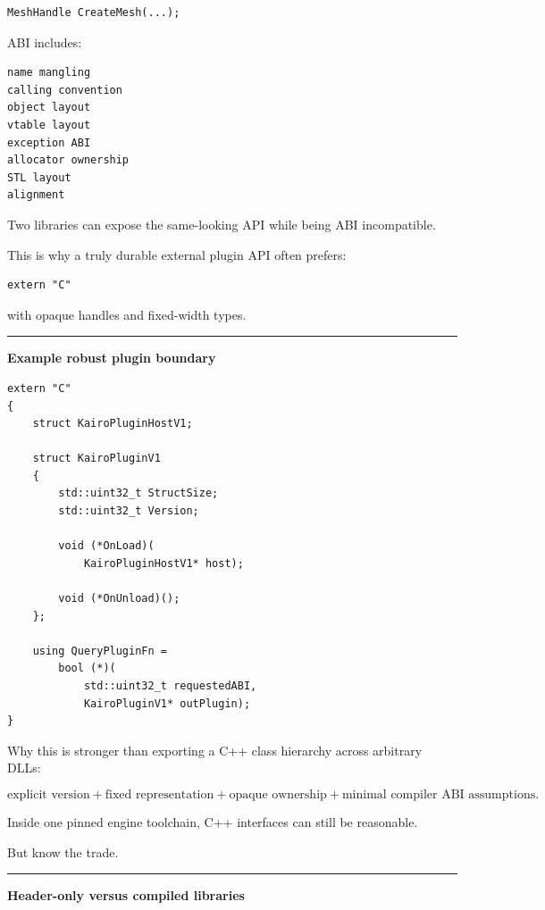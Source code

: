 \begin{verbatim}
MeshHandle CreateMesh(...);
\end{verbatim}

ABI includes:

\begin{verbatim}
name mangling
calling convention
object layout
vtable layout
exception ABI
allocator ownership
STL layout
alignment
\end{verbatim}

Two libraries can expose the same-looking API while being ABI incompatible.

This is why a truly durable external plugin API often prefers:

\begin{verbatim}
extern "C"
\end{verbatim}

with opaque handles and fixed-width types.

\begin{center}\rule{0.5\linewidth}{0.5pt}\end{center}

\textbf{Example robust plugin boundary}

\begin{verbatim}
extern "C"
{
    struct KairoPluginHostV1;

    struct KairoPluginV1
    {
        std::uint32_t StructSize;
        std::uint32_t Version;

        void (*OnLoad)(
            KairoPluginHostV1* host);

        void (*OnUnload)();
    };

    using QueryPluginFn =
        bool (*)(
            std::uint32_t requestedABI,
            KairoPluginV1* outPlugin);
}
\end{verbatim}

Why this is stronger than exporting a C++ class hierarchy across arbitrary DLLs:

\[
\boxed{
\text{explicit version}
+
\text{fixed representation}
+
\text{opaque ownership}
+
\text{minimal compiler ABI assumptions}.
}
\]

Inside one pinned engine toolchain, C++ interfaces can still be reasonable.

But know the trade.

\begin{center}\rule{0.5\linewidth}{0.5pt}\end{center}

\textbf{Header-only versus compiled libraries}

